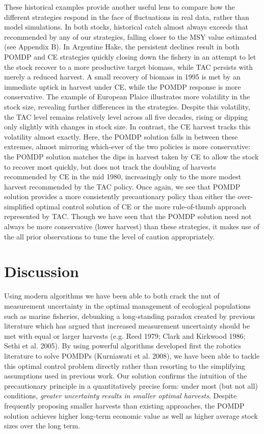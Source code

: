 \documentclass[3p]{elsarticle} %
\begin{document}
These historical examples provide another useful lens to compare how the
different strategies respond in the face of fluctuations in real data,
rather than model simulations. In both stocks, historical catch almost
always exceeds that recommended by any of our strategies, falling closer
to the MSY value estimated (see Appendix B). In Argentine Hake, the
persistent declines result in both POMDP and CE strategies quickly
closing down the fishery in an attempt to let the stock recover to a
more productive target biomass, while TAC persists with merely a reduced
harvest. A small recovery of biomass in 1995 is met by an immediate
uptick in harvest under CE, while the POMDP response is more
conservative. The example of European Plaice illustrates more volatility
in the stock size, revealing further differences in the strategies.
Despite this volatility, the TAC level remains relatively level across
all five decades, rising or dipping only slightly with changes in stock
size. In contrast, the CE harvest tracks this volatility almost exactly.
Here, the POMDP solution falls in between these extremes, almost
mirroring which-ever of the two policies is more conservative: the POMDP
solution matches the dips in harvest taken by CE to allow the stock to
recover most quickly, but does not track the doubling of harvests
recommended by CE in the mid 1980, increasingly only to the more modest
harvest recommended by the TAC policy. Once again, we see that POMDP
solution provides a more consistently precautionary policy than either
the over-simplified optimal control solution of CE or the more
rule-of-thumb approach represented by TAC. Though we have seen that the
POMDP solution need not always be more conservative (lower harvest) than
these strategies, it makes use of the all prior observations to tune the
level of caution appropriately.

\hypertarget{discussion}{%
\section{Discussion}\label{discussion}}

Using modern algorithms we have been able to both crack the nut of
measurement uncertainty in the optimal management of ecological
populations such as marine fisheries, debunking a long-standing paradox
created by previous literature which has argued that increased
measurement uncertainty should be met with equal or larger harvests
(e.g. Reed 1979; Clark and Kirkwood 1986; Sethi et al. 2005). By using
powerful algorithms developed first the robotics literature to solve
POMDPs (Kurniawati et al. 2008), we have been able to tackle this
optimal control problem directly rather than resorting to the
simplifying assumptions used in previous work. Our solution confirms the
intuition of the precautionary principle in a quantitatively precise
form: under most (but not all) conditions, \emph{greater uncertainty
results in smaller optimal harvests}. Despite frequently proposing
smaller harvests than existing approaches, the POMDP solution achieves
higher long-term economic value as well as higher average stock sizes
over the long term.
\end{document}
